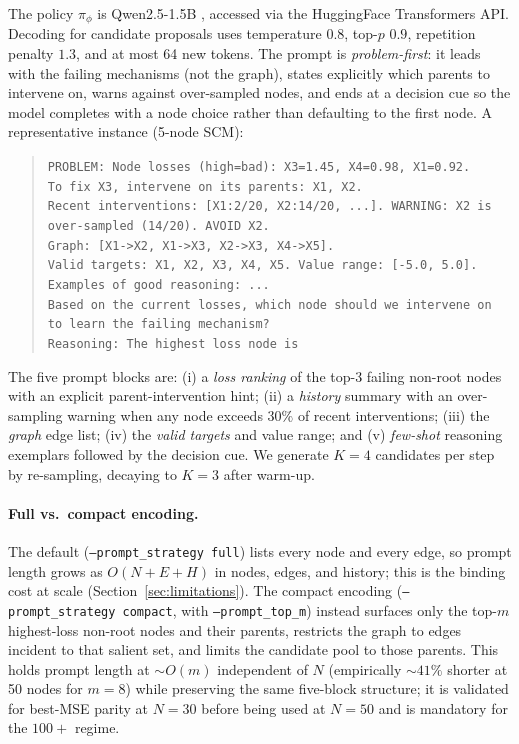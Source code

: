 The policy $\pi_\phi$ is Qwen2.5-1.5B \citep{qwen2_5}, accessed via the HuggingFace Transformers API. Decoding for candidate proposals uses temperature $0.8$, top-$p$ $0.9$, repetition penalty $1.3$, and at most 64 new tokens. The prompt is \emph{problem-first}: it leads with the failing mechanisms (not the graph), states explicitly which parents to intervene on, warns against over-sampled nodes, and ends at a decision cue so the model completes with a node choice rather than defaulting to the first node. A representative instance (5-node SCM):
\begin{quote}\small
\texttt{PROBLEM: Node losses (high=bad): X3=1.45, X4=0.98, X1=0.92.}\\
\texttt{To fix X3, intervene on its parents: X1, X2.}\\
\texttt{Recent interventions: [X1:2/20, X2:14/20, ...]. WARNING: X2 is}\\
\texttt{over-sampled (14/20). AVOID X2.}\\
\texttt{Graph: [X1->X2, X1->X3, X2->X3, X4->X5].}\\
\texttt{Valid targets: X1, X2, X3, X4, X5. Value range: [-5.0, 5.0].}\\
\texttt{Examples of good reasoning: ...}\\
\texttt{Based on the current losses, which node should we intervene on}\\
\texttt{to learn the failing mechanism?}\\
\texttt{Reasoning: The highest loss node is}
\end{quote}
The five prompt blocks are: (i) a \emph{loss ranking} of the top-3 failing non-root nodes with an explicit parent-intervention hint; (ii) a \emph{history} summary with an over-sampling warning when any node exceeds $30\%$ of recent interventions; (iii) the \emph{graph} edge list; (iv) the \emph{valid targets} and value range; and (v) \emph{few-shot} reasoning exemplars followed by the decision cue. We generate $K=4$ candidates per step by re-sampling, decaying to $K=3$ after warm-up.

\paragraph{Full vs.\ compact encoding.} The default (\texttt{--prompt\_strategy full}) lists every node and every edge, so prompt length grows as $O(N\!+\!E\!+\!H)$ in nodes, edges, and history; this is the binding cost at scale (Section~\ref{sec:limitations}). The compact encoding (\texttt{--prompt\_strategy compact}, with \texttt{--prompt\_top\_m}) instead surfaces only the top-$m$ highest-loss non-root nodes and their parents, restricts the graph to edges incident to that salient set, and limits the candidate pool to those parents. This holds prompt length at $\sim\!O(m)$ independent of $N$ (empirically $\sim\!41\%$ shorter at 50 nodes for $m{=}8$) while preserving the same five-block structure; it is validated for best-MSE parity at $N{=}30$ before being used at $N{=}50$ and is mandatory for the $100+$ regime.

